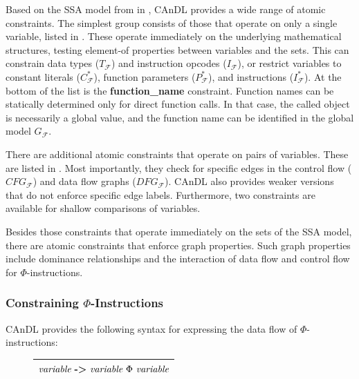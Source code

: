     Based on the SSA model from  in ,
    CAnDL provides a wide range of atomic constraints.
    The simplest group consists of those that operate on only a single variable,
    listed in .
    These operate immediately on the underlying mathematical structures, testing
    element-of properties between variables and the sets.
    This can constrain data types ($T_\mathcal{F}$) and 
    instruction opcodes ($I_\mathcal{F}$), or 
    restrict variables to constant literals ($C_\mathcal{F}^*$), function
    parameters ($P_\mathcal{F}^*$), and instructions ($I_\mathcal{F}^*$).
    At the bottom of the list is the {\bf function\_name} constraint.
    Function names can be statically determined only for direct function calls.
    In that case, the called object is necessarily a global value, and the
    function name can be identified in the global model $G_\mathcal F$.

    There are additional atomic constraints that operate on pairs of variables.
    These are listed in .
    Most importantly, they check for specific edges in the control flow
    ($CFG_\mathcal F$) and data flow graphs ($DFG_\mathcal F$).
    CAnDL also provides weaker versions that do not enforce specific edge
    labels.
    Furthermore, two constraints are available for shallow comparisons of
    variables.

    Besides those constraints that operate immediately on the sets of the
    SSA model, there are atomic constraints that enforce graph properties.
    Such graph properties include dominance relationships and the interaction of
    data flow and control flow for $\Phi$-instructions.

\subsubsection{Constraining $\Phi$-Instructions}

    CAnDL provides the following syntax for expressing the data flow
    of $\Phi$-instructions:
\begin{figure}[h]
    \centering
    \begin{tabular}{|c|}
        \hline
        $\text{\it variable}\ \text{\bf ->}\ \text{\it variable}\ \Phi\ \text{\it variable}$\\
        \hline
    \end{tabular}
\end{figure}

